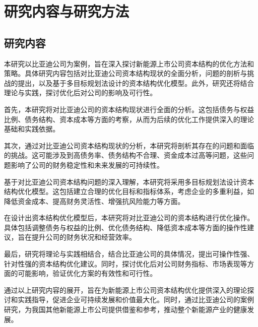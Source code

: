 \section{研究内容与研究方法}
\subsection{研究内容}
本研究以比亚迪公司为案例，旨在深入探讨新能源上市公司资本结构的优化方法和策略。具体研究内容包括对比亚迪公司资本结构现状的全面分析，问题的剖析与挑战的提出，以及基于多目标规划法设计的资本结构优化模型。此外，研究还将结合理论与实践，探讨优化后对公司的影响及可行性。

首先，本研究将对比亚迪公司的资本结构现状进行全面的分析。这包括债务与权益比例、债务结构、资本成本等方面的考察，从而为后续的优化工作提供深入的理论基础和实践依据。

其次，通过对比亚迪公司资本结构现状的分析，本研究将剖析其存在的问题和面临的挑战。这可能涉及到高债务率、债务结构不合理、资金成本过高等问题，这些问题影响了公司的财务稳定性和未来发展的可持续性。

基于对比亚迪公司资本结构问题的深入理解，本研究将采用多目标规划法设计资本结构优化模型。这包括建立合理的优化目标和指标体系，考虑企业的多重利益，如降低资金成本、提高财务灵活性、增强抗风险能力等方面。

在设计出资本结构优化模型后，本研究将对比亚迪公司的资本结构进行优化操作。具体包括调整债务与权益的比例、优化债务结构、降低资本成本等方面的操作性建议，旨在提升公司的财务状况和经营效率。

最后，研究将理论与实践相结合，结合比亚迪公司的具体情况，提出可操作性强、针对性强的资本结构优化建议。同时，探讨优化后对公司财务指标、市场表现等方面的可能影响，验证优化方案的有效性和可行性。

通过以上研究内容的展开，旨在为新能源上市公司资本结构优化提供深入的理论探讨和实践指导，促进企业可持续发展和价值最大化。同时，通过比亚迪公司的案例研究，为我国其他新能源上市公司提供借鉴和参考，推动整个新能源产业的健康发展。

